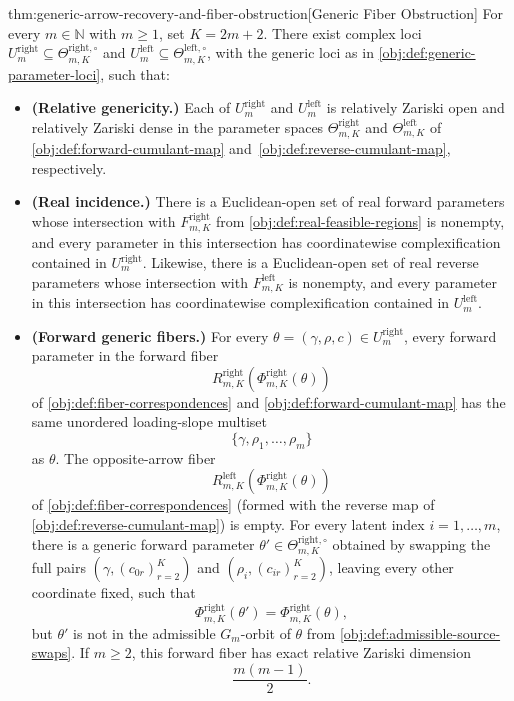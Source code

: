 \documentclass[11pt]{article}
\begin{document}
\begin{theoremv}{thm:generic-arrow-recovery-and-fiber-obstruction}[Generic Fiber Obstruction]
For every \(m\in\mathbb N\) with \(m\ge 1\), set \(K=2m+2\).  There exist complex loci
\(U^{\mathrm{right}}_m\subseteq \Theta^{\mathrm{right},\circ}_{m,K}\) and
\(U^{\mathrm{left}}_m\subseteq \Theta^{\mathrm{left},\circ}_{m,K}\), with the generic loci as in \cref{obj:def:generic-parameter-loci}, such that:
\begin{itemize}
\item \textbf{(Relative genericity.)}  Each of \(U^{\mathrm{right}}_m\) and \(U^{\mathrm{left}}_m\) is relatively Zariski open and relatively Zariski dense in the parameter spaces \(\Theta^{\mathrm{right}}_{m,K}\) and \(\Theta^{\mathrm{left}}_{m,K}\) of \cref{obj:def:forward-cumulant-map} and~\cref{obj:def:reverse-cumulant-map}, respectively.

\item \textbf{(Real incidence.)}  There is a Euclidean-open set of real forward parameters whose intersection with \(F^{\mathrm{right}}_{m,K}\) from \cref{obj:def:real-feasible-regions} is nonempty, and every parameter in this intersection has coordinatewise complexification contained in \(U^{\mathrm{right}}_m\).  Likewise, there is a Euclidean-open set of real reverse parameters whose intersection with \(F^{\mathrm{left}}_{m,K}\) is nonempty, and every parameter in this intersection has coordinatewise complexification contained in \(U^{\mathrm{left}}_m\).

\item \textbf{(Forward generic fibers.)}  For every \(\theta=(\gamma,\rho,c)\in U^{\mathrm{right}}_m\), every forward parameter in the forward fiber
\[
R^{\mathrm{right}}_{m,K}\!\left(\Phi^{\mathrm{right}}_{m,K}(\theta)\right)
\]
of \cref{obj:def:fiber-correspondences} and \cref{obj:def:forward-cumulant-map} has the same unordered loading-slope multiset
\[
\{\gamma,\rho_1,\ldots,\rho_m\}
\]
as \(\theta\).  The opposite-arrow fiber
\[
R^{\mathrm{left}}_{m,K}\!\left(\Phi^{\mathrm{right}}_{m,K}(\theta)\right)
\]
of \cref{obj:def:fiber-correspondences} (formed with the reverse map of \cref{obj:def:reverse-cumulant-map}) is empty.  For every latent index \(i=1,\ldots,m\), there is a generic forward parameter \(\theta'\in\Theta^{\mathrm{right},\circ}_{m,K}\) obtained by swapping the full pairs \((\gamma,(c_{0r})_{r=2}^K)\) and \((\rho_i,(c_{ir})_{r=2}^K)\), leaving every other coordinate fixed, such that
\[
\Phi^{\mathrm{right}}_{m,K}(\theta')
=
\Phi^{\mathrm{right}}_{m,K}(\theta),
\]
but \(\theta'\) is not in the admissible \(G_m\)-orbit of \(\theta\) from \cref{obj:def:admissible-source-swaps}.  If \(m\ge 2\), this forward fiber has exact relative Zariski dimension
\[
\frac{m(m-1)}{2}.
\]


\end{itemize}
\end{theoremv}
\end{document}
